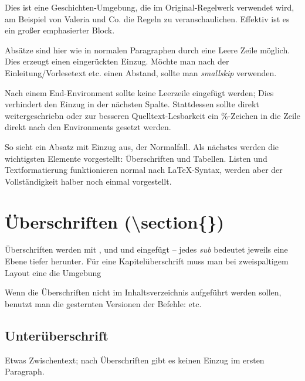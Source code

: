 \begin{multicols}{2}[        %
		]                    %

\begin{geschichte}
	Dies ist eine Geschichten-Umgebung, die im Original-Regelwerk verwendet wird, am Beispiel von Valeria und Co. die Regeln zu veranschaulichen. Effektiv ist es ein großer emphasierter Block.

	Absätze sind hier wie in normalen Paragraphen durch eine Leere Zeile möglich. Dies erzeugt einen eingerückten Einzug. Möchte man nach der Einleitung/Vorlesetext etc. einen Abstand, sollte man \emph{smallskip} verwenden.
\end{geschichte}

Nach einem End-Environment sollte keine Leerzeile eingefügt werden; Dies verhindert den Einzug in der nächsten Spalte. Stattdessen sollte direkt weitergeschriebn oder zur besseren Quelltext-Lesbarkeit ein \%-Zeichen in die Zeile direkt nach den Environments gesetzt werden.

So sieht ein Absatz mit Einzug aus, der Normalfall. Als nächstes werden die wichtigsten Elemente vorgestellt: Überschriften und Tabellen. Listen und Textformatierung funktionieren normal nach \LaTeX-Syntax, werden aber der Vollständigkeit halber noch einmal vorgestellt.


	\section[Überschriften]{Überschriften (\textbackslash{}section\{\})}
	Überschriften werden mit ,  und  und  eingefügt -- jedes \emph{sub} bedeutet jeweils eine Ebene tiefer herunter.
	Für eine Kapitelüberschrift muss man bei zweispaltigem Layout eine  die Umgebung  

	Wenn die Überschriften nicht im Inhaltsverzeichnis aufgeführt werden sollen, benutzt man die gesternten Versionen der Befehle:  etc.
	\subsection{Unterüberschrift}
	Etwas Zwischentext; nach Überschriften gibt es keinen Einzug im ersten Paragraph.

\end{multicols}
